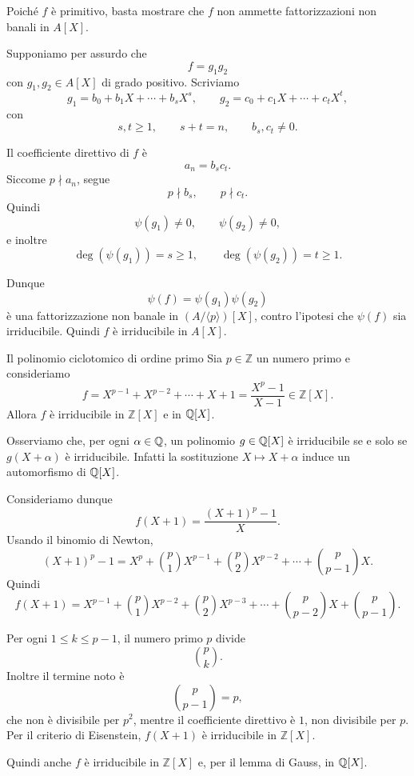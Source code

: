 \documentclass[a4paper]{article}
\begin{document}
\begin{snippetproof}{}
    Poiché \(f\) è primitivo, basta mostrare che \(f\) non ammette fattorizzazioni non banali in \(A[X]\).

    Supponiamo per assurdo che
    \[
        f=g_1g_2
    \]
    con \(g_1,g_2\in A[X]\) di grado positivo.
    Scriviamo
    \[
        g_1=b_0+b_1X+\cdots+b_sX^s,
        \qquad
        g_2=c_0+c_1X+\cdots+c_tX^t,
    \]
    con
    \[
        s,t\geq 1,
        \qquad
        s+t=n,
        \qquad
        b_s,c_t\neq 0.
    \]

    Il coefficiente direttivo di \(f\) è
    \[
        a_n=b_sc_t.
    \]
    Siccome \(p\nmid a_n\), segue
    \[
        p\nmid b_s,
        \qquad
        p\nmid c_t.
    \]
    Quindi
    \[
        \psi(g_1)\neq 0,
        \qquad
        \psi(g_2)\neq 0,
    \]
    e inoltre
    \[
        \deg(\psi(g_1))=s\geq 1,
        \qquad
        \deg(\psi(g_2))=t\geq 1.
    \]

    Dunque
    \[
        \psi(f)=\psi(g_1)\psi(g_2)
    \]
    è una fattorizzazione non banale in \((A/\langle p \rangle)[X]\), contro l'ipotesi che \(\psi(f)\) sia irriducibile.
    Quindi \(f\) è irriducibile in \(A[X]\).
\end{snippetproof}

\begin{snippetexample}{Il polinomio ciclotomico di ordine primo}
    Sia \(p\in\mathbb{Z}\) un numero primo e consideriamo
    \[
        f=X^{p-1}+X^{p-2}+\cdots+X+1
        =
        \frac{X^p-1}{X-1}
        \in \mathbb{Z}[X].
    \]
    Allora \(f\) è irriducibile in \(\mathbb{Z}[X]\) e in \(\mathbb{Q}[X]\).
\end{snippetexample}

\begin{snippetproof}{}
    Osserviamo che, per ogni \(\alpha\in\mathbb{Q}\), un polinomio \(g\in\mathbb{Q}[X]\) è irriducibile se e solo se \(g(X+\alpha)\) è irriducibile.
    Infatti la sostituzione \(X\mapsto X+\alpha\) induce un automorfismo di \(\mathbb{Q}[X]\).

    Consideriamo dunque
    \[
        f(X+1)
        =
        \frac{(X+1)^p-1}{X}.
    \]
    Usando il binomio di Newton,
    \[
        (X+1)^p-1
        =
        X^p+\binom{p}{1}X^{p-1}
        +\binom{p}{2}X^{p-2}
        +\cdots+
        \binom{p}{p-1}X.
    \]
    Quindi
    \[
        f(X+1)
        =
        X^{p-1}
        +
        \binom{p}{1}X^{p-2}
        +
        \binom{p}{2}X^{p-3}
        +\cdots+
        \binom{p}{p-2}X
        +
        \binom{p}{p-1}.
    \]

    Per ogni \(1\leq k\leq p-1\), il numero primo \(p\) divide
    \[
        \binom{p}{k}.
    \]
    Inoltre il termine noto è
    \[
        \binom{p}{p-1}=p,
    \]
    che non è divisibile per \(p^2\), mentre il coefficiente direttivo è \(1\), non divisibile per \(p\).
    Per il criterio di Eisenstein, \(f(X+1)\) è irriducibile in \(\mathbb{Z}[X]\).

    Quindi anche \(f\) è irriducibile in \(\mathbb{Z}[X]\) e, per il lemma di Gauss, in \(\mathbb{Q}[X]\).
\end{snippetproof}
\end{document}
